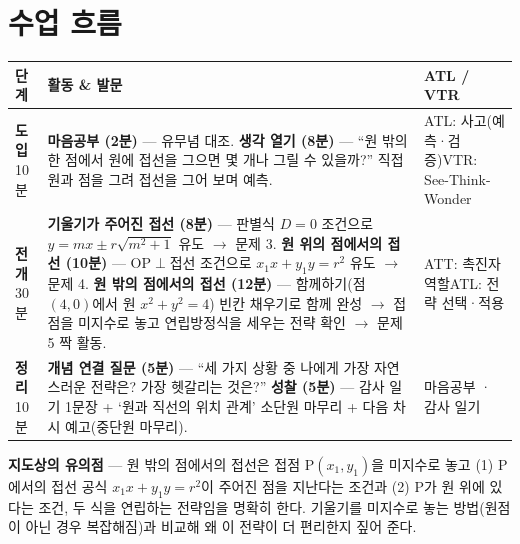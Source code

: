 \documentclass[11pt,a4paper]{article}
\begin{document}
\section{수업 흐름}
\begin{tabularx}{\linewidth}{@{}>{\centering\arraybackslash}p{1.6cm}X>{\raggedright\arraybackslash\small}p{3.1cm}@{}}
\toprule
\textbf{단계} & \textbf{활동 \& 발문} & \textbf{ATL / VTR} \\
\midrule
\textcolor{goldstrong}{\textbf{도입}}\newline\footnotesize 10분 &
\textbf{마음공부 (2분)} --- 유무념 대조.\newline
\textbf{생각 열기 (8분)} --- ``원 밖의 한 점에서 원에 접선을 그으면 몇 개나 그릴 수 있을까?'' 직접 원과 점을 그려 접선을 그어 보며 예측. &
ATL: 사고(예측·검증)\newline VTR: See-Think-Wonder \\
\addlinespace
\textcolor{goldstrong}{\textbf{전개}}\newline\footnotesize 30분 &
\textbf{기울기가 주어진 접선 (8분)} --- 판별식 $D=0$ 조건으로 $y=mx\pm r\sqrt{m^2+1}$ 유도 $\to$ 문제 3.\newline
\textbf{원 위의 점에서의 접선 (10분)} --- OP$\perp$접선 조건으로 $x_1x+y_1y=r^2$ 유도 $\to$ 문제 4.\newline
\textbf{원 밖의 점에서의 접선 (12분)} --- 함께하기(점$(4,0)$에서 원 $x^2+y^2=4$) 빈칸 채우기로 함께 완성 $\to$ 접점을 미지수로 놓고 연립방정식을 세우는 전략 확인 $\to$ 문제 5 짝 활동. &
ATT: 촉진자 역할\newline ATL: 전략 선택·적용 \\
\addlinespace
\textcolor{goldstrong}{\textbf{정리}}\newline\footnotesize 10분 &
\textbf{개념 연결 질문 (5분)} --- ``세 가지 상황 중 나에게 가장 자연스러운 전략은? 가장 헷갈리는 것은?''\newline
\textbf{성찰 (5분)} --- 감사 일기 1문장 + `원과 직선의 위치 관계' 소단원 마무리 + 다음 차시 예고(중단원 마무리). &
마음공부 · 감사 일기 \\
\bottomrule
\end{tabularx}

\begin{calloutbox}
\textbf{지도상의 유의점} --- 원 밖의 점에서의 접선은 접점 P$(x_1,y_1)$을 미지수로 놓고 (1) P에서의 접선 공식 $x_1x+y_1y=r^2$이 주어진 점을 지난다는 조건과 (2) P가 원 위에 있다는 조건, 두 식을 연립하는 전략임을 명확히 한다. 기울기를 미지수로 놓는 방법(원점이 아닌 경우 복잡해짐)과 비교해 왜 이 전략이 더 편리한지 짚어 준다.
\end{calloutbox}
\end{document}
